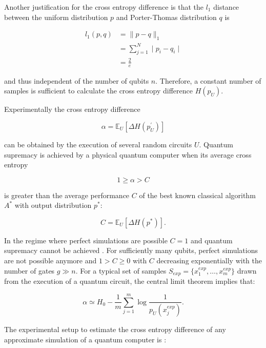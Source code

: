 Another justification for the cross entropy difference is that the $l_1$ distance between the uniform distribution $p$ and Porter-Thomas distribution $q$ is

\begin{align}
  l_1(p,q) &= \| p-q\|_1 \\
           &= \sum_{j=1}^N \mid p_i - q_i \mid \\
           &= \frac{2}{e}
\end{align}

and thus independent of the number of qubits $n$. Therefore, a
constant number of samples is sufficient to calculate the cross entropy difference $H(p_U)$.

Experimentally the cross entropy difference

\begin{equation}
  \alpha = \mathbb{E}_U[\Delta H(p^{\prime}_U)]
\end{equation}

can be obtained by the execution of several random circuits $U$. Quantum
supremacy is achieved by a physical quantum computer when its average cross
entropy

\begin{equation}
  1 \geq \alpha > C
\end{equation}

is greater than the average performance $C$ of the best known classical algorithm $A^*$ with 
output distribution $p^*$:

\begin{equation}
  C = \mathbb{E}_U[\Delta H(p^*)] .
\end{equation}

In the regime where perfect simulations are possible $C=1$ and quantum
supremacy cannot be achieved \cite{Boixo2018supremacy}. For sufficiently many qubits, perfect simulations
are not possible anymore and $1 > C \geq 0$ with $C$ decreasing exponentially
with the number of gates $g\gg n$. For a typical set of samples $S_{exp} = \{x_1^{exp}, \dots , x_m^{exp}\}$ drawn from the
execution of a quantum circuit, the central limit theorem implies that:

\begin{equation}
  \label{eq:cef}
  \alpha \simeq H_0 - \frac{1}{m} \sum_{j = 1}^m \log{\frac{1}{p_U(x_j^{exp})}}.
\end{equation}

The experimental setup to estimate the cross entropy difference of any
approximate simulation of a quantum computer is \cite{Boixo2018supremacy}:

